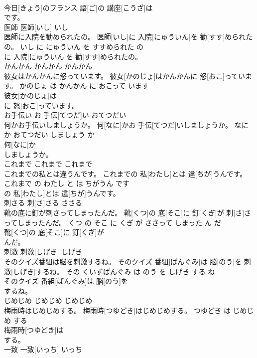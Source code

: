\documentclass[8pt]{extreport}
\begin{document}
\begin{CJK}{UTF8}{min}
\\	今日[きょう]のフランス 語[ご]の 講座[こうざ]は
\\	です。			
\\	医師	医師[いし]	いし	
\\	医師に入院を勧められたの。	医師[いし]に 入院[にゅういん]を 勧[すす]められたの。	いし に にゅういん を すすめられた の	
\\	に 入院[にゅういん]を 勧[すす]められたの。			
\\	かんかん	かんかん	かんかん	
\\	彼女はかんかんに怒っています。	彼女[かのじょ]はかんかんに 怒[おこ]っています。	かのじょ は かんかん に おこって います	
\\	彼女[かのじょ]は
\\	に 怒[おこ]っています。			
\\	お手伝い	お 手伝[てつだ]い	おてつだい	
\\	何かお手伝いしましょうか。	何[なに]かお 手伝[てつだ]いしましょうか。	なに か おてつだい しましょう か	
\\	何[なに]か
\\	しましょうか。			
\\	これまで	これまで	これまで	
\\	これまでの私とは違うんです。	これまでの 私[わたし]とは 違[ちが]うんです。	これまで の わたし と は ちがうん です	
\\	の 私[わたし]とは 違[ちが]うんです。			
\\	刺さる	刺[さ]さる	ささる	
\\	靴の底に釘が刺さってしまったんだ。	靴[くつ]の 底[そこ]に 釘[くぎ]が 刺[さ]さってしまったんだ。	くつ の そこ に くぎ が ささって しまった ん だ	
\\	靴[くつ]の 底[そこ]に 釘[くぎ]が
\\	んだ。			
\\	刺激	刺激[しげき]	しげき	
\\	そのクイズ番組は脳を刺激するね。	そのクイズ 番組[ばんぐみ]は 脳[のう]を 刺激[しげき]するね。	その くいずばんぐみ は のう を しげき する ね	
\\	そのクイズ 番組[ばんぐみ]は 脳[のう]を
\\	するね。			
\\	じめじめ	じめじめ	じめじめ	
\\	梅雨時はじめじめする。	梅雨時[つゆどき]はじめじめする。	つゆどき は じめじめ する	
\\	梅雨時[つゆどき]は
\\	する。			
\\	一致	一致[いっち]	いっち	

\end{CJK}
\end{document}
